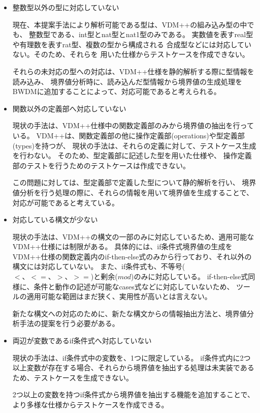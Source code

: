 \documentclass[uplatex, report, a4j, 10pt]{jsbook}
\begin{document}
\begin{itemize}
  \item 整数型以外の型に対応していない

	現在、本提案手法により解析可能である型は、VDM++の組み込み型の中でも、
	整数型である、int型とnat型とnat1型のみである。
	実数値を表すreal型や有理数を表すrat型、複数の型から構成される
	合成型などには対応していない。そのため、それらを
	用いた仕様からテストケースを作成できない。

	それらの未対応の型への対応は、VDM++仕様を静的解析する際に型情報を読み込み、
	境界値分析時に、読み込んだ型情報から境界値の生成処理をBWDMに追加することによって、対応可能であると考えられる。

  \item 関数以外の定義部へ対応していない

	現状の手法は、VDM++仕様中の関数定義部のみから境界値の抽出を行っている。
	VDM++は、関数定義部の他に操作定義部(operations)や型定義部(types)を持つが、
	現状の手法は、それらの定義に対して、テストケース生成を行わない。
	そのため、型定義部に記述した型を用いた仕様や、
	操作定義部のテストを行うためのテストケースは作成できない。

	この問題に対しては、型定義部で定義した型について静的解析を行い、
	境界値分析を行う処理の際に、それらの情報を用いて境界値を生成することで、
	対応が可能であると考えている。

  \item 対応している構文が少ない

	現状の手法は、VDM++の構文の一部のみに対応しているため、適用可能なVDM++仕様には制限がある。
	具体的には、if条件式境界値の生成をVDM++仕様の関数定義内のif-then-else式のみから行っており、それ以外の構文には対応していない。
	また、if条件式も、不等号($<、<=、>、>=$)と剰余($mod$)のみに対応している。
	if-then-else式同様に、条件と動作の記述が可能なcases式などに対応していないため、
	ツールの適用可能な範囲はまだ狭く、実用性が高いとは言えない。

	新たな構文への対応のために、新たな構文からの情報抽出方法と、境界値分析手法の提案を行う必要がある。

  \item 両辺が変数であるif条件式へ対応していない

	現状の手法は、if条件式中の変数を、1つに限定している。
	if条件式内に2つ以上変数が存在する場合、それらから境界値を抽出する処理は未実装であるため、テストケースを生成できない。

	2つ以上の変数を持つif条件式から境界値を抽出する機能を追加することで、
	より多様な仕様からテストケースを作成できる。
\end{itemize}
\end{document}
